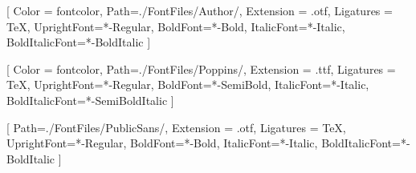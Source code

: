 \usepackage[T1]{fontenc} %
\usepackage[style=spanish]{csquotes} %

\usepackage{calc}

\usepackage{geometry}
\geometry{
    letterpaper,
    margin = .7in,
    headheight = .3in,
    headsep = .2in,
    footskip = 0.2in+12pt, %
    marginparwidth = .4in,
    marginparsep = .15in,
}
\pagestyle{empty}

\setlength{\parskip}{.5\baselineskip}
\setlength{\parindent}{0pt}

\usepackage{xcolor}


\usepackage{fontspec}

\setmainfont{Author}[
    Color = fontcolor,
    Path=./FontFiles/Author/,
    Extension = .otf,
    Ligatures = TeX,
    UprightFont=*-Regular,
    BoldFont=*-Bold,
    ItalicFont=*-Italic,
    BoldItalicFont=*-BoldItalic
    ]

[
    Color = fontcolor,
    Path=./FontFiles/Poppins/,
    Extension = .ttf,
    Ligatures = TeX,
    UprightFont=*-Regular,
    BoldFont=*-SemiBold,
    ItalicFont=*-Italic,
    BoldItalicFont=*-SemiBoldItalic
    ]

[
    Path=./FontFiles/PublicSans/,
    Extension = .otf,
    Ligatures = TeX,
    UprightFont=*-Regular,
    BoldFont=*-Bold,
    ItalicFont=*-Italic,
    BoldItalicFont=*-BoldItalic
    ]

\usepackage{scalefnt}

\usepackage{url}
\renewcommand{\UrlFont}{\rmfamily}

\usepackage{setspace}

